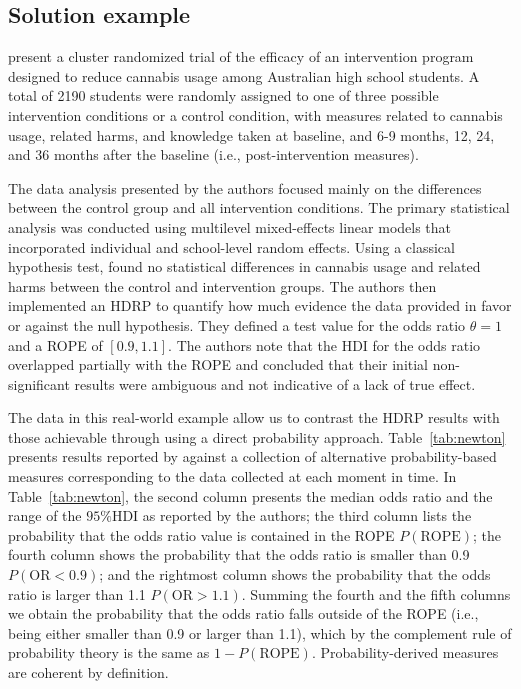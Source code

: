 \documentclass[9pt,twocolumn,twoside]{cidlab-draft}\templatetype{cidlab-invited}
\newcommand{\hdr}{HDRP}
\newcommand{\HDI}{\text{HDI}}
\begin{document}
\subsection*{Solution example}

 present a cluster randomized trial of the efficacy of an intervention program designed to reduce cannabis usage among Australian high school students. A total of 2190 students were randomly assigned to one of three possible intervention conditions or a control condition, with measures related to cannabis usage, related harms, and knowledge taken at baseline, and 6-9 months, 12, 24, and 36 months after the baseline (i.e., post-intervention measures).  

The data analysis presented by the authors focused mainly on the differences between the control group and all intervention conditions. The primary statistical analysis was conducted using multilevel mixed-effects linear models that incorporated individual and school-level random effects. 
%
Using a classical hypothesis test, \citeauthor{newton2018} found no statistical differences in cannabis usage and related harms between the control and intervention groups. 
%
The authors then implemented an \hdr{} to quantify how much evidence the data provided in favor or against the null hypothesis. %
They defined a test value for the odds ratio $\theta=1$ and a ROPE of $[0.9,1.1]$. The authors note that the HDI for the odds ratio overlapped partially with the ROPE and concluded that their initial non-significant results were ambiguous and not indicative of a lack of true effect.

The data in this real-world example allow us to contrast the \hdr{} results with those achievable through using a direct probability approach.  Table~\ref{tab:newton} presents results reported by \citeauthor{newton2018} against a collection of alternative probability-based measures corresponding to the data collected at each moment in time. 
%
In Table~\ref{tab:newton}, the second column presents the median odds ratio and the range of the $95\% \HDI$ as reported by the authors; the third column lists the probability that the odds ratio value is contained in the ROPE $P(\text{ROPE})$; the fourth column shows the probability that the odds ratio is smaller than 0.9 $P(\text{OR}<0.9)$; and the rightmost column shows the probability that the odds ratio is larger than 1.1 $P(\text{OR}>1.1)$. Summing the fourth and the fifth columns we obtain the probability that the odds ratio falls outside of the ROPE (i.e., being either smaller than 0.9 or larger than 1.1), which by the complement rule of probability theory is the same as $1-P(\text{ROPE})$. Probability-derived measures are coherent by definition. 
\end{document}
